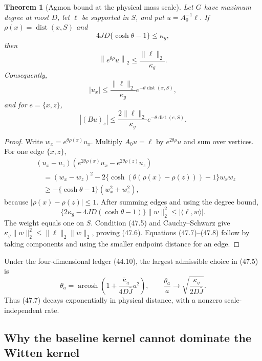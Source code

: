\documentclass[11pt]{article}
\newtheorem{theorem}{Theorem}[section]
\theoremstyle{remark}
\begin{document}
\begin{theorem}[Agmon bound at the physical mass scale]
\label{thm:v17v47-agmon}
Let \(G\) have maximum degree at most \(D\), let
\(\ell\) be supported in \(S\), and put \(u=A_0^{-1}\ell\).  If
\(\rho(x)=\operatorname{dist}(x,S)\) and
\[
 4JD\{\cosh\theta-1\}\leq\kappa_g,                \tag{47.5}
\]
then
\[
\boxed{
 \left\|e^{\theta\rho}u\right\|_2
 \leq\frac{\|\ell\|_2}{\kappa_g}.}                \tag{47.6}
\]
Consequently,
\[
 |u_x|\leq
 \frac{\|\ell\|_2}{\kappa_g}
 e^{-\theta\operatorname{dist}(x,S)},             \tag{47.7}
\]
and for \(e=\{x,z\}\),
\[
 |(Bu)_e|
 \leq
 \frac{2\|\ell\|_2}{\kappa_g}
 e^{-\theta\operatorname{dist}(e,S)}.             \tag{47.8}
\]
\end{theorem}

\begin{proof}
Write \(w_x=e^{\theta\rho(x)}u_x\).  Multiply
\(A_0u=\ell\) by \(e^{2\theta\rho}u\) and sum over vertices.  For one
edge \(\{x,z\}\),
\[
\begin{aligned}
 &(u_x-u_z)
 (e^{2\theta\rho(x)}u_x-e^{2\theta\rho(z)}u_z)\\
 &\quad=
 (w_x-w_z)^2
 -2\{\cosh(\theta(\rho(x)-\rho(z)))-1\}w_xw_z\\
 &\quad\geq
 -\{\cosh\theta-1\}(w_x^2+w_z^2),                 \tag{47.9}
\end{aligned}
\]
because \(|\rho(x)-\rho(z)|\leq1\).
After summing edges and using the degree bound,
\[
 \{2\kappa_g-4JD(\cosh\theta-1)\}\|w\|_2^2
 \leq|\langle\ell,w\rangle|.                      \tag{47.10}
\]
The weight equals one on \(S\).  Condition (47.5) and
Cauchy--Schwarz give
\(\kappa_g\|w\|_2^2\leq\|\ell\|_2\|w\|_2\), proving
(47.6).  Equations (47.7)--(47.8) follow by taking components and
using the smaller endpoint distance for an edge.
\end{proof}

Under the four-dimensional ledger (44.10), the largest admissible
choice in (47.5) is
\[
 \theta_a=
 \operatorname{arcosh}
 \left(1+\frac{\bar\kappa_g}{4D\bar J}a^2\right),
 \qquad
 \frac{\theta_a}{a}
 \longrightarrow
 \sqrt{\frac{\bar\kappa_g}{2D\bar J}}.             \tag{47.11}
\]
Thus (47.7) decays exponentially in physical distance, with a
nonzero scale-independent rate.

\subsection{Why the baseline kernel cannot dominate the Witten kernel}
\end{document}
